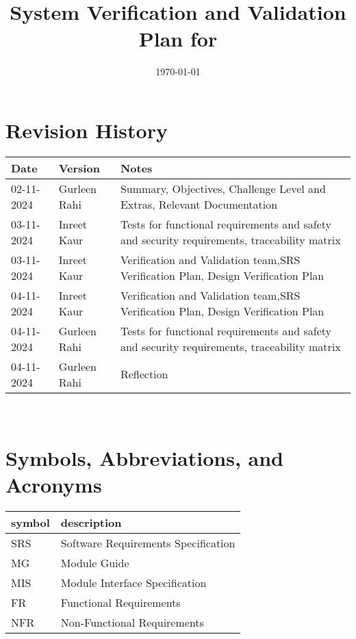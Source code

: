 \documentclass[12pt, titlepage]{article}
\begin{document}
\title{System Verification and Validation Plan for \progname{}} 
\author{\authname}
\date{\today}
	
\maketitle


\section*{Revision History}

\begin{tabularx}{\textwidth}{p{3cm}p{2cm}X}
\toprule {\bf Date} & {\bf Version} & {\bf Notes}\\
\midrule
02-11-2024 & Gurleen Rahi & Summary, Objectives, Challenge Level and Extras, Relevant Documentation\\
03-11-2024 & Inreet Kaur & Tests for functional requirements and safety and security requirements, traceability matrix\\
03-11-2024 & Inreet Kaur & Verification and Validation team,SRS Verification Plan, Design Verification Plan\\
04-11-2024 & Inreet Kaur & Verification and Validation team,SRS Verification Plan, Design Verification Plan\\
04-11-2024 & Gurleen Rahi & Tests for functional requirements and safety and security requirements, traceability matrix\\
04-11-2024 & Gurleen Rahi & Reflection\\
\bottomrule
\end{tabularx}

~\\

\newpage

\tableofcontents

\listoftables


\newpage

\section{Symbols, Abbreviations, and Acronyms} \label{section:1}

\renewcommand{\arraystretch}{1.2}
\begin{tabular}{l l} 
  \toprule		
  \textbf{symbol} & \textbf{description}\\
  \midrule 
  SRS & Software Requirements Specification\\
  MG & Module Guide\\
  MIS & Module Interface Specification\\
  FR & Functional Requirements\\
  NFR & Non-Functional Requirements\\
  \bottomrule
\end{tabular}\\
\end{document}
